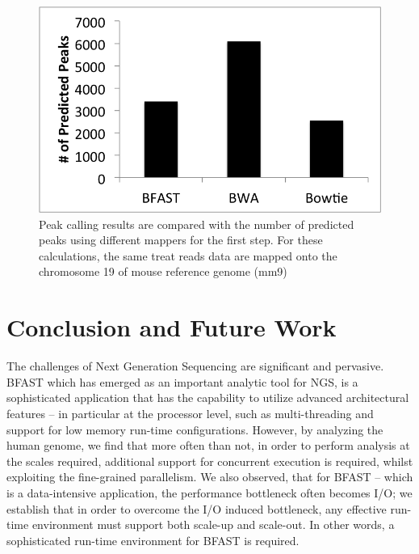 \documentclass{cpeauth}
\begin{document}
\begin{figure}
 \centering
\includegraphics[scale=0.40]{figures/peaks_tool.png}


\caption{\small %
  Peak calling results are compared with the number of predicted peaks using different mappers for the first step.  For
  these calculations, the same treat reads data are mapped onto the chromosome 19 of mouse reference genome (mm9)}
  \label{fig:chip-seq-comp-2} 
 \end{figure}



\section{Conclusion and Future Work}

The challenges of Next Generation Sequencing are significant
and pervasive.
BFAST which has emerged as an important analytic tool for NGS, is  a sophisticated application that has the
capability to utilize advanced architectural features -- in particular
at the processor level, such as multi-threading and support for low
memory run-time configurations. However, by analyzing the human
genome, we find that more often than not, in order to perform analysis
at the scales required, additional support for concurrent execution is
required, whilst exploiting the fine-grained parallelism. We also
observed, that for BFAST -- which is a data-intensive application,
the performance bottleneck often becomes I/O; we establish that in
order to overcome the I/O induced bottleneck, any effective run-time
environment must support both scale-up and scale-out. In other words,
a sophisticated run-time environment for BFAST is required.
\end{document}
